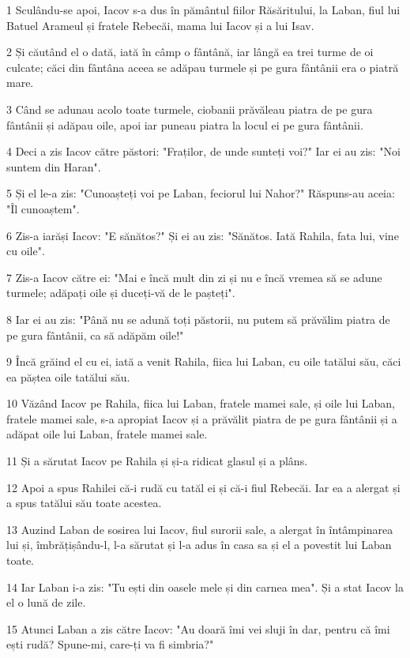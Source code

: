 \par 1 Sculându-se apoi, Iacov s-a dus în pământul fiilor Răsăritului, la Laban, fiul lui Batuel Arameul și fratele Rebecăi, mama lui Iacov și a lui Isav.
\par 2 Și căutând el o dată, iată în câmp o fântână, iar lângă ea trei turme de oi culcate; căci din fântâna aceea se adăpau turmele și pe gura fântânii era o piatră mare.
\par 3 Când se adunau acolo toate turmele, ciobanii prăvăleau piatra de pe gura fântânii și adăpau oile, apoi iar puneau piatra la locul ei pe gura fântânii.
\par 4 Deci a zis Iacov către păstori: "Fraților, de unde sunteți voi?" Iar ei au zis: "Noi suntem din Haran".
\par 5 Și el le-a zis: "Cunoașteți voi pe Laban, feciorul lui Nahor?" Răspuns-au aceia: "Îl cunoaștem".
\par 6 Zis-a iarăși Iacov: "E sănătos?" Și ei au zis: "Sănătos. Iată Rahila, fata lui, vine cu oile".
\par 7 Zis-a Iacov către ei: "Mai e încă mult din zi și nu e încă vremea să se adune turmele; adăpați oile și duceți-vă de le pașteți".
\par 8 Iar ei au zis: "Până nu se adună toți păstorii, nu putem să prăvălim piatra de pe gura fântânii, ca să adăpăm oile!"
\par 9 Încă grăind el cu ei, iată a venit Rahila, fiica lui Laban, cu oile tatălui său, căci ea păștea oile tatălui său.
\par 10 Văzând Iacov pe Rahila, fiica lui Laban, fratele mamei sale, și oile lui Laban, fratele mamei sale, s-a apropiat Iacov și a prăvălit piatra de pe gura fântânii și a adăpat oile lui Laban, fratele mamei sale.
\par 11 Și a sărutat Iacov pe Rahila și și-a ridicat glasul și a plâns.
\par 12 Apoi a spus Rahilei că-i rudă cu tatăl ei și că-i fiul Rebecăi. Iar ea a alergat și a spus tatălui său toate acestea.
\par 13 Auzind Laban de sosirea lui Iacov, fiul surorii sale, a alergat în întâmpinarea lui și, îmbrățișându-l, l-a sărutat și l-a adus în casa sa și el a povestit lui Laban toate.
\par 14 Iar Laban i-a zis: "Tu ești din oasele mele și din carnea mea". Și a stat Iacov la el o lună de zile.
\par 15 Atunci Laban a zis către Iacov: "Au doară îmi vei sluji în dar, pentru că îmi ești rudă? Spune-mi, care-ți va fi simbria?"
